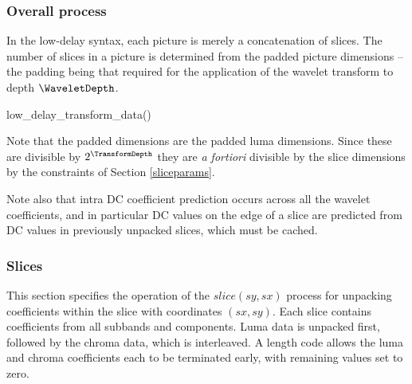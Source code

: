 \subsubsection{Overall process}
\label{ldpicture}

In the low-delay syntax, each picture is merely a concatenation of slices. 
The number of slices in a picture is determined from the padded picture dimensions
-- the padding being that required for the application of the wavelet transform to depth $\WaveletDepth$.

\begin{pseudo}{low\_delay\_transform\_data()}{}
  \bsEND
\bsEND
{}
\bsEND
\end{pseudo}

Note that the padded dimensions are the padded luma dimensions. Since these are divisible 
by $2^\TransformDepth$ they are {\em a fortiori} divisible by the slice dimensions by 
the constraints of Section \ref{sliceparams}. 

Note also that intra DC coefficient prediction
occurs across all the wavelet coefficients, and in particular DC values on the edge of a slice
are predicted from DC values in previously unpacked slices, which must be cached. 

\subsubsection{Slices}
\label{sliceparsing}

This section specifies the operation of the $slice(sy,sx)$ process for unpacking coefficients
within the slice with coordinates $(sx,sy)$. Each slice
contains coefficients from all subbands and components. Luma data is unpacked first, followed by the chroma data, which
is interleaved. A length code allows the luma and chroma coefficients each to be terminated early, with remaining values
set to zero.

